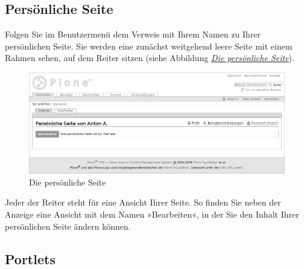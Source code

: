\documentclass[a4paper,12pt,ngerman]{manual}
\begin{document}
\subsection{Persönliche Seite}

Folgen Sie im Benutzermenü dem Verweis mit Ihrem Namen zu Ihrer persönlichen
Seite. Sie werden eine zunächst weitgehend leere Seite mit einem Rahmen sehen,
auf dem Reiter sitzen (siehe Abbildung \hyperlink{fig-persoenliche-seite}{\emph{Die persönliche Seite}}).
\hypertarget{fig-persoenliche-seite}{}\begin{figure}[htbp]
\centering

\includegraphics[width=1.000\linewidth]{persoenliche-seite.png}
\caption{Die persönliche Seite}\end{figure}

Jeder der Reiter steht für eine Ansicht Ihrer
Seite. So finden Sie neben der Anzeige eine Ansicht mit dem Namen
»Bearbeiten«, in der Sie den Inhalt Ihrer persönlichen Seite ändern können.


\subsection{Portlets}
\end{document}
